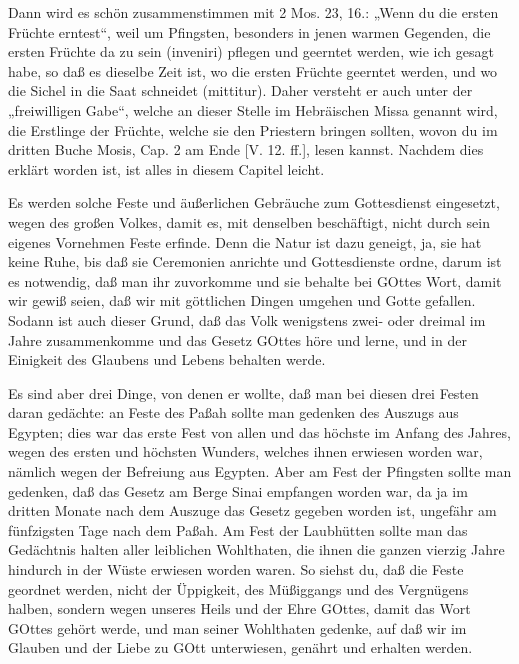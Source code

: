 Dann wird es schön zusammenstimmen mit 2 Mos. 23, 16.: „Wenn du die ersten Früchte erntest“, weil um Pfingsten, besonders in jenen warmen Gegenden, die ersten Früchte da zu sein (inveniri) pflegen und geerntet werden, wie ich gesagt habe, so daß es dieselbe Zeit ist, wo die ersten Früchte geerntet werden, und wo die Sichel in die Saat schneidet (mittitur). Daher versteht er auch unter der „freiwilligen Gabe“, welche an dieser Stelle im Hebräischen Missa genannt wird, die Erstlinge der Früchte, welche sie den Priestern bringen sollten, wovon du im dritten Buche Mosis, Cap. 2 am Ende [V. 12. ff.], lesen kannst. Nachdem dies erklärt worden ist, ist alles in diesem Capitel leicht.

Es werden solche Feste und äußerlichen Gebräuche zum Gottesdienst eingesetzt, wegen des großen Volkes, damit es, mit denselben beschäftigt, nicht durch sein eigenes Vornehmen Feste erfinde. Denn die Natur ist dazu geneigt, ja, sie hat keine Ruhe, bis daß sie Ceremonien anrichte und Gottesdienste ordne, darum ist es notwendig, daß man ihr zuvorkomme und sie behalte bei GOttes Wort, damit wir gewiß seien, daß wir mit göttlichen Dingen umgehen und Gotte gefallen. Sodann ist auch dieser Grund, daß das Volk wenigstens zwei- oder dreimal im Jahre zusammenkomme und das Gesetz GOttes höre und lerne, und in der Einigkeit des Glaubens und Lebens behalten werde.

Es sind aber drei Dinge, von denen er wollte, daß man bei diesen drei Festen daran gedächte: an Feste des Paßah sollte man gedenken des Auszugs aus Egypten; dies war das erste Fest von allen und das höchste im Anfang des Jahres, wegen des ersten und höchsten Wunders, welches ihnen erwiesen worden war, nämlich wegen der Befreiung aus Egypten. Aber am Fest der Pfingsten sollte man gedenken, daß das Gesetz am Berge Sinai empfangen worden war, da ja im dritten Monate nach dem Auszuge das Gesetz gegeben worden ist, ungefähr am fünfzigsten Tage nach dem Paßah. Am Fest der Laubhütten sollte man das Gedächtnis halten aller leiblichen Wohlthaten, die ihnen die ganzen vierzig Jahre hindurch in der Wüste erwiesen worden waren. So siehst du, daß die Feste geordnet werden, nicht der Üppigkeit, des Müßiggangs und des Vergnügens halben, sondern wegen unseres Heils und der Ehre GOttes, damit das Wort GOttes gehört werde, und man seiner Wohlthaten gedenke, auf daß wir im Glauben und der Liebe zu GOtt unterwiesen, genährt und erhalten werden.

